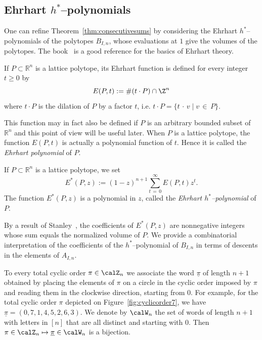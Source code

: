 \subsection{\texorpdfstring{Ehrhart $h^*$--polynomials}{Ehrhart h*-polynomials}}

One can refine Theorem~\ref{thm:consecutivesums} by considering the Ehrhart $h^*$--polynomials of the polytopes $B_{I,n}$, whose evaluations at $1$ give the volumes of the polytopes. The book~\cite{BR15} is a good reference for the basics of Ehrhart theory.

\begin{defi}
If $P\subset \mathbb{R}^n$ is a lattice polytope, its Ehrhart function is defined for every integer $t\geq 0$ by
\[
E(P, t) := \# (t\cdot P) \cap \Z^n
\]
where $t\cdot P$ is the dilation of $P$ by a factor $t$, i.e. $t\cdot P = \{t\,\cdot\,v\;|\;v\,\in\,P\}$.
\end{defi}

This function may in fact also be defined if $P$ is an arbitrary bounded subset of $\mathbb{R}^n$ and this point of view will be useful later. When $P$ is a lattice polytope, the function $E(P,t)$ is actually a polynomial function of $t$. Hence it is called the \emph{Ehrhart polynomial} of $P$.

\begin{defi}
If $P\subset \mathbb{R}^n$ is a lattice polytope, we set
\[
E^*(P,z) := (1-z)^{n+1} \sum_{t\,=\,0}^\infty E(P,t) z^t.
\]
The function $E^*(P,z)$ is a polynomial in $z$, called the \emph{Ehrhart $h^*$--polynomial} of $P$.
\end{defi}

By a result of Stanley~\cite{S80}, the coefficients of $E^*(P,z)$ are nonnegative integers whose sum equals the normalized volume of $P$. We provide a combinatorial interpretation of the coefficients of the $h^*$--polynomial of $B_{I,n}$ in terms of descents in the elements of $A_{I,n}$.

To every total cyclic order $\pi\in\calZ_n$ we associate the word $\underline{\pi}$ of length $n+1$ obtained by placing the elements of $\pi$ on a circle in the cyclic order imposed by $\pi$ and reading them in the clockwise direction, starting from $0$. For example, for the total cyclic order $\pi$ depicted on Figure~\ref{fig:cyclicorder7}, we have $\underline{\pi}=(0,7,1,4,5,2,6,3)$. We denote by $\calW_n$ the set of words of length $n+1$ with letters in $[n]$ that are all distinct and starting with $0$. Then $\pi \in\calZ_n \mapsto \underline{\pi} \in\calW_n$ is a bijection.

